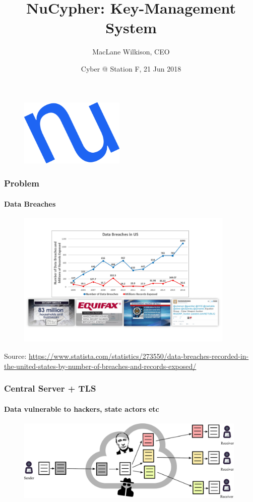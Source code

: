 \documentclass[xetex,mathsans,sans]{beamer}
\title[NuCypher]{NuCypher: Key-Management System}
\author[MacLane]{MacLane Wilkison, CEO}
\date[21 Jun 2018]{Cyber @ Station F, 21 Jun 2018}
\begin{document}
    \begin{frame}
        \titlepage
        \begin{figure}
            \centering
            \includegraphics[width=5cm]{pdf/nucypher_logo.pdf}
        \end{figure}
    \end{frame}

    \begin{frame}
      \frametitle{Problem}
      \framesubtitle{Data Breaches}
        \begin{figure}
            \centering
            \includegraphics[height=6.5cm]{pdf/data-breaches.pdf}
        \end{figure}

        {\tiny Source: \url{https://www.statista.com/statistics/273550/data-breaches-recorded-in-the-united-states-by-number-of-breaches-and-records-exposed/} \par}
    \end{frame}

    \begin{frame}
        \frametitle{Central Server + TLS}
        \framesubtitle{Data vulnerable to hackers, state actors etc}
        \begin{figure}
            \centering
            \includegraphics[width=11cm]{pdf/file-sharing-tls.pdf}
        \end{figure}
    \end{frame}
\end{document}
